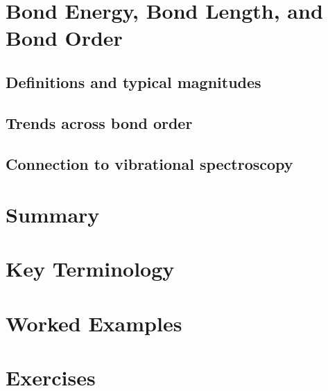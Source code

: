 \documentclass[11pt]{article}
\begin{document}
\section{Bond Energy, Bond Length, and Bond Order}
	\subsection{Definitions and typical magnitudes}
	\subsection{Trends across bond order}
	\subsection{Connection to vibrational spectroscopy}

\section{Summary}

\section{Key Terminology}

\section{Worked Examples}

\section{Exercises}
\end{document}
